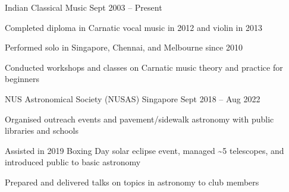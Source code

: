 \begin{cventries}
	{Indian Classical Music} %
	{} %
	{Sept 2003 -- Present} %
	{
		\begin{cvitems} %
			\item Completed diploma in Carnatic vocal music in 2012 and violin in 2013
			\item Performed solo in Singapore, Chennai, and Melbourne since 2010
			\item Conducted workshops and classes on Carnatic music theory and practice for beginners
		\end{cvitems}
	}

	{NUS Astronomical Society (NUSAS)} %
	{Singapore} %
	{Sept 2018 -- Aug 2022} %
	{
		\begin{cvitems} %
			\item Organised outreach events and pavement/sidewalk astronomy with public libraries and schools
			\item Assisted in 2019 Boxing Day solar eclipse event, managed \textasciitilde5 telescopes, and introduced public to basic astronomy
			\item Prepared and delivered talks on topics in astronomy to club members
		\end{cvitems}
	}

\end{cventries}
